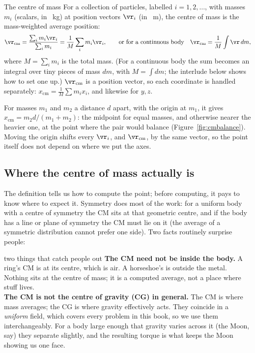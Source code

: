 \begin{defbox}{The centre of mass}
For a collection of particles, labelled $i=1,2,\dots$, with masses $m_i$ (scalars, in \SI{}{kg}) at
position vectors $\vr_i$ (in \SI{}{m}), the centre of mass is the mass-weighted average position:
\[
\vr_{\text{cm}}=\frac{\sum_i m_i\vr_i}{\sum_i m_i}=\frac{1}{M}\sum_i m_i\vr_i,
\qquad\text{or for a continuous body}\quad \vr_{\text{cm}}=\frac{1}{M}\int \vr\,dm,
\]
where $M=\sum_i m_i$ is the total mass. (For a continuous body the sum becomes an integral over tiny
pieces of mass $dm$, with $M=\int dm$; the interlude below shows how to set one up.) $\vr_{\text{cm}}$ is a position vector, so each
coordinate is handled separately: $x_{\text{cm}}=\frac{1}{M}\sum m_i x_i$, and likewise for $y,z$.
\end{defbox}

For masses $m_1$ and $m_2$ a distance $d$ apart, with the origin at $m_1$, it gives
$x_{\text{cm}}=m_2d/(m_1+m_2)$: the midpoint for equal masses, and otherwise nearer the heavier one, at the point where the pair would balance (Figure~\ref{fig:cmbalance}). Moving
the origin shifts every $\vr_i$, and $\vr_{\text{cm}}$, by the same vector, so the point itself does not
depend on where we put the axes.

\begin{figure}[htbp]
\centering
{}
\end{figure}

\subsection{Where the centre of mass actually is}

The definition tells us how to compute the point; before computing, it pays to know where to expect it.
Symmetry does most of the work: for a uniform body with a centre of symmetry the CM sits at that geometric centre, and if the body
has a line or plane of symmetry the CM must lie on it (the average of a symmetric distribution cannot prefer one side).
Two facts routinely surprise people:

\begin{trapbox}{two things that catch people out}
\textbf{The CM need not be inside the body.} A ring's CM is at its centre, which is air. A horseshoe's
is outside the metal. Nothing sits at the centre of mass; it is a computed average, not a place where
stuff lives. \\[3pt]
\textbf{The CM is not the centre of gravity (CG) in general.} The CM is where mass averages; the CG is where
gravity effectively acts. They coincide in a \emph{uniform} field, which covers every problem in this book, so
we use them interchangeably. For a body large enough that gravity varies across it (the Moon, say) they
separate slightly, and the resulting torque is what keeps the Moon showing us one face.
\end{trapbox}

